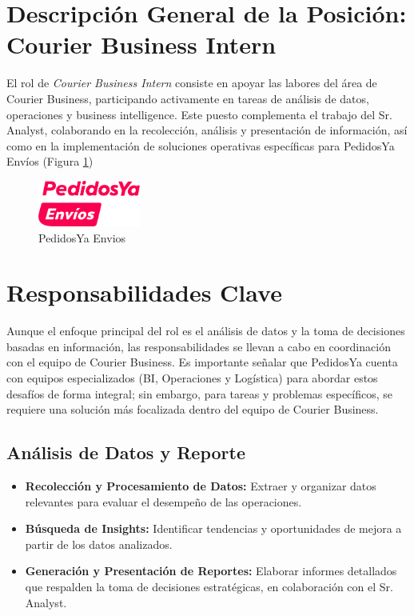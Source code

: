 \section{Descripción General de la Posición: Courier Business Intern \label{sec:sec1}}
El rol de \textit{Courier Business Intern} consiste en apoyar las labores del área de Courier Business, participando activamente en tareas de análisis de datos, operaciones y business intelligence. Este puesto complementa el trabajo del Sr. Analyst, colaborando en la recolección, análisis y presentación de información, así como en la implementación de soluciones operativas específicas para PedidosYa Envíos (Figura \ref{fig:pedidosya_envios_logo})

\begin{figure}[ht]
	\begin{center}
	\includegraphics[width=0.3\textwidth]{./figures/pedidosya_envios_logo.png}
	\caption[PeidosYa Envios]{PedidosYa Envios}
  \label{fig:pedidosya_envios_logo}
	\end{center}
\end{figure}

\section{Responsabilidades Clave \label{sec:sec2}}
Aunque el enfoque principal del rol es el análisis de datos y la toma de decisiones basadas en información, las responsabilidades se llevan a cabo en coordinación con el equipo de Courier Business. Es importante señalar que PedidosYa cuenta con equipos especializados (BI, Operaciones y Logística) para abordar estos desafíos de forma integral; sin embargo, para tareas y problemas específicos, se requiere una solución más focalizada dentro del equipo de Courier Business.

\subsection{Análisis de Datos y Reporte}
\begin{itemize}
  \item \textbf{Recolección y Procesamiento de Datos:} Extraer y organizar datos relevantes para evaluar el desempeño de las operaciones.
  \item \textbf{Búsqueda de Insights:} Identificar tendencias y oportunidades de mejora a partir de los datos analizados.
  \item \textbf{Generación y Presentación de Reportes:} Elaborar informes detallados que respalden la toma de decisiones estratégicas, en colaboración con el Sr. Analyst.
\end{itemize}


